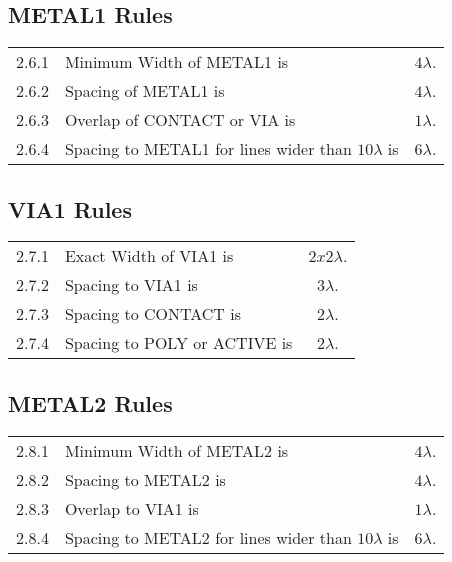 \subsection{METAL1 Rules}\label{design_rules_metal1_rules}

\begin{flushleft}
    \begin{tabular}{c l c}
        2.6.1   & Minimum Width of METAL1 is & $4 \lambda$. \\
        2.6.2   & Spacing of METAL1 is & $4 \lambda$. \\
        2.6.3   & Overlap of CONTACT or VIA is & $1 \lambda$. \\
        2.6.4   & Spacing to METAL1 for lines wider than $10 \lambda $ is & $6 \lambda$. \\
    \end{tabular}
\end{flushleft}

\subsection{VIA1 Rules}\label{design_rules_via1_rules}

\begin{flushleft}
    \begin{tabular}{c l c}
        2.7.1   & Exact Width of VIA1 is & $2x2 \lambda$. \\
        2.7.2   & Spacing to VIA1 is & $3 \lambda$. \\
        2.7.3   & Spacing to CONTACT is & $2 \lambda$. \\
        2.7.4   & Spacing to POLY or ACTIVE is & $2 \lambda$. \\
    \end{tabular}
\end{flushleft}

\subsection{METAL2 Rules}\label{design_rules_metal2_rules}

\begin{flushleft}
    \begin{tabular}{c l c}
        2.8.1   & Minimum Width of METAL2 is & $4 \lambda$. \\
        2.8.2   & Spacing to METAL2 is & $4 \lambda$. \\
        2.8.3   & Overlap to VIA1 is & $1 \lambda$. \\
        2.8.4   & Spacing to METAL2 for lines wider than $10 \lambda $ is & $6 \lambda$. \\
    \end{tabular}
\end{flushleft}

